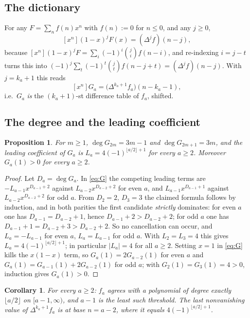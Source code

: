\documentclass[11pt]{amsart}
\newtheorem{proposition}[theorem]{Proposition}
\newtheorem{corollary}[theorem]{Corollary}
\theoremstyle{remark}
\begin{document}
\subsection*{The dictionary}
For any $F=\sum_{n}f(n)x^n$ with $f(n):=0$ for $n\le0$, and any $j\ge0$,
\begin{equation}\label{eq:dict}
 [x^n](1-x)^jF(x)=(\Delta^jf)(n-j),
\end{equation}
because $[x^n](1-x)^jF=\sum_i(-1)^i\binom ji f(n-i)$, and re-indexing $i=j-t$
turns this into $(-1)^j\sum_t(-1)^t\binom jt f(n-j+t)=(\Delta^jf)(n-j)$. With
$j=k_a+1$ this reads
\begin{equation}\label{eq:dictG}
 [x^n]G_a=\bigl(\Delta^{k_a+1}f_a\bigr)(n-k_a-1),
\end{equation}
i.e.\ $G_a$ \emph{is} the $(k_a+1)$-st difference table of $f_a$, shifted.

\subsection*{The degree and the leading coefficient}
\begin{proposition}\label{prop:deg}
For $m\ge1$, $\deg G_{2m}=3m-1$ and $\deg G_{2m+1}=3m$, and the leading
coefficient of $G_a$ is $L_a=4(-1)^{\lfloor a/2\rfloor+1}$ for every $a\ge2$.
Moreover $G_a(1)>0$ for every $a\ge2$.
\end{proposition}

\begin{proof}
Let $D_a=\deg G_a$. In \eqref{eq:G} the competing leading terms are
$-L_{a-1}x^{D_{a-1}+2}$ against $L_{a-2}x^{D_{a-2}+2}$ for even $a$, and
$L_{a-1}x^{D_{a-1}+1}$ against $L_{a-2}x^{D_{a-2}+2}$ for odd $a$. From
$D_2=2$, $D_3=3$ the claimed formula follows by induction, and in both parities
the first candidate \emph{strictly} dominates: for even $a$ one has
$D_{a-1}=D_{a-2}+1$, hence $D_{a-1}+2>D_{a-2}+2$; for odd $a$ one has
$D_{a-1}+1=D_{a-2}+3>D_{a-2}+2$. So no cancellation can occur, and
$L_a=-L_{a-1}$ for even $a$, $L_a=L_{a-1}$ for odd $a$. With $L_2=L_3=4$ this
gives $L_a=4(-1)^{\lfloor a/2\rfloor+1}$; in particular $|L_a|=4$ for all
$a\ge2$. Setting $x=1$ in \eqref{eq:G} kills the $x(1-x)$ term, so
$G_a(1)=2G_{a-2}(1)$ for even $a$ and $G_a(1)=G_{a-1}(1)+2G_{a-2}(1)$ for odd
$a$; with $G_2(1)=G_3(1)=4>0$, induction gives $G_a(1)>0$.
\end{proof}

\begin{corollary}\label{cor:threshold}
For every $a\ge2$: $f_a$ agrees with a polynomial of degree exactly
$\lfloor a/2\rfloor$ on $[a-1,\infty)$, and $a-1$ is the least such threshold.
The last nonvanishing value of $\Delta^{k_a+1}f_a$ is at base $n=a-2$, where it
equals $4(-1)^{\lfloor a/2\rfloor+1}$.
\end{corollary}
\end{document}
